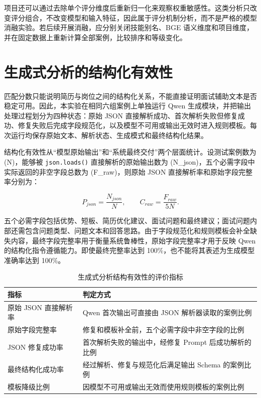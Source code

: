 \documentclass[UTF8,zihao=-4,a4paper,oneside]{ctexrep}
\begin{document}
项目还可以通过去除单个评分维度后重新归一化来观察权重敏感性。这类分析只改变评分组合，不改变模型和输入特征，因此属于评分机制分析，而不是严格的模型消融实验。若后续开展消融，应分别关闭技能别名、BGE 语义维度和项目维度，并在固定数据上重新计算全部案例，比较排序和等级变化。


\section{生成式分析的结构化有效性}


匹配分数只能说明简历与岗位之间的结构化关系，不能直接证明面试辅助文本是否稳定可用。因此，本实验在相同六组案例上单独运行 Qwen 生成模块，并把输出处理过程划分为四种状态：原始 JSON 直接解析成功、首次解析失败但修复成功、修复失败后完成字段规范化，以及模型不可用或输出无效时进入规则模板。每次运行均保存原始文本、解析状态、生成模式和最终结构化结果。


结构化有效性从“模型原始输出”和“系统最终交付”两个层面统计。设测试案例数为 (N)，能够被 \texttt{json.loads()} 直接解析的原始输出数为 (N_{json})，五个必需字段中实际返回的非空字段总数为 (F_{raw})，则原始 JSON 直接解析率和原始字段完整率分别为：


\begin{equation}
P_{json}=\frac{N_{json}}{N},\qquad
C_{raw}=\frac{F_{raw}}{5N}.
\end{equation}


五个必需字段包括优势、短板、简历优化建议、面试问题和最终建议；面试问题内部还需包含问题类型、问题文本和回答思路。由于字段规范化和规则模板会补全缺失内容，最终字段完整率用于衡量系统鲁棒性，原始字段完整率才用于反映 Qwen 的结构化指令遵循能力。即使最终完整率达到 100\%，也不能将其表述为生成模型准确率达到 100\%。


\begin{table}[H]
  \centering
  \caption{生成式分析结构有效性的评价指标}
  \small
  \begin{tabularx}{\textwidth}{>{\raggedright\arraybackslash}p{3.3cm}>{\raggedright\arraybackslash}X}
    \toprule
    指标 & 判定方式 \\
    \midrule
    原始 JSON 直接解析率 & Qwen 首次输出可直接由 JSON 解析器读取的案例比例 \\
    原始字段完整率 & 修复和模板补全前，五个必需字段中非空字段的比例 \\
    JSON 修复成功率 & 首次解析失败的输出中，经修复 Prompt 后成功解析的比例 \\
    最终结构化成功率 & 经过解析、修复与规范化后满足输出 Schema 的案例比例 \\
    模板降级比例 & 因模型不可用或输出无效而使用规则模板的案例比例 \\
    \bottomrule
  \end{tabularx}
\end{table}
\end{document}
